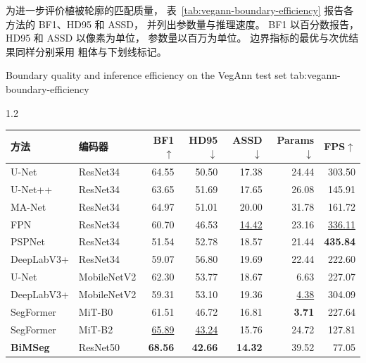 为进一步评价植被轮廓的匹配质量，
表~\ref{tab:vegann-boundary-efficiency}
报告各方法的 BF1、HD95 和 ASSD，
并列出参数量与推理速度。
BF1 以百分数报告，
HD95 和 ASSD 以像素为单位，
参数量以百万为单位。
边界指标的最优与次优结果同样分别采用
粗体与下划线标记。


\begin{table}[!htb]
  \centering
    {Boundary quality and inference efficiency on the VegAnn test set}
    {tab:vegann-boundary-efficiency}
  \begin{spacing}{1.2}
    \small
    \setlength{\tabcolsep}{2pt}
    \renewcommand{\arraystretch}{1.15}
    \begin{tabular*}{\linewidth}{@{\extracolsep{\fill}}llrrrrr@{}}
      \toprule
      方法 & 编码器 & BF1\(\uparrow\) & HD95\(\downarrow\)
        & ASSD\(\downarrow\) & Params\(\downarrow\) & FPS\(\uparrow\) \\
      \midrule
      U-Net & ResNet34 & 64.55 & 50.50 & 17.38 & 24.44 & 303.50 \\
      U-Net++ & ResNet34 & 63.65 & 51.69 & 17.65 & 26.08 & 145.91 \\
      MA-Net & ResNet34 & 64.97 & 51.01 & 20.00 & 31.78 & 161.72 \\
      FPN & ResNet34 & 60.70 & 46.53 & \underline{14.42} & 23.16 & \underline{336.11} \\
      PSPNet & ResNet34 & 51.54 & 52.78 & 18.57 & 21.44 & \textbf{435.84} \\
      DeepLabV3+ & ResNet34 & 59.07 & 56.80 & 19.69 & 22.44 & 222.60 \\
      U-Net & MobileNetV2 & 62.30 & 53.77 & 18.67 & 6.63 & 227.07 \\
      DeepLabV3+ & MobileNetV2 & 59.31 & 53.10 & 19.36 & \underline{4.38} & 304.09 \\
      SegFormer & MiT-B0 & 61.51 & 46.72 & 16.81 & \textbf{3.71} & 227.64 \\
      SegFormer & MiT-B2 & \underline{65.89} & \underline{43.24} & 15.76 & 24.72 & 127.81 \\
      \midrule
      \textbf{BiMSeg} & ResNet50 & \textbf{68.56} & \textbf{42.66} & \textbf{14.32} & 39.52 & 77.05 \\
      \bottomrule
    \end{tabular*}
  \end{spacing}
  \par\vspace{8pt}
  \noindent\begin{minipage}{\linewidth}

\end{minipage}
\end{table}

